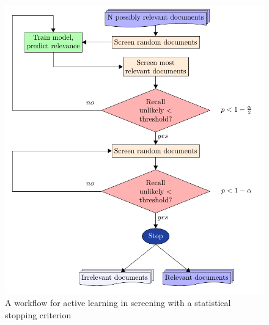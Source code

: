 \documentclass{bmcart}
\begin{document}
	\medskip
	
	\begin{figure}
		\includegraphics[width=0.7\linewidth]{../images/flow}
		\caption{A workflow for active learning in screening with a statistical stopping criterion}
		\label{flow}
	\end{figure}

%	
\end{document}
